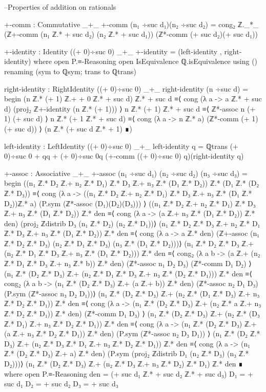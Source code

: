 \documentclass[11pt,a4paper]{article}
\begin{document}
\begin{code}
--Properties of addition on rationals

+-comm : Commutative _+_
+-comm (n₁ ÷suc d₁)(n₂ ÷suc d₂) = cong₂ ℤ._*_ (ℤ+-comm (n₁ ℤ.* + suc d₂)
  (n₂ ℤ.* + suc d₁)) (ℤ*-comm (+ suc d₂)(+ suc d₁))

+-identity : Identity ((+ 0)÷suc 0) _+_
+-identity = (left-identity , right-identity)
  where
  open P.≡-Reasoning
  open IsEquivalence ℚ.isEquivalence using ()
      renaming (sym to ℚsym; trans to ℚtrans)

  right-identity : RightIdentity  ((+ 0)÷suc 0) _+_
  right-identity (n ÷suc d) = begin
    (n ℤ.* (+ 1) ℤ.+ + 0 ℤ.* + suc d) ℤ.* + suc d  ≡⟨ cong (λ a -> a ℤ.* + suc d)
      (proj₂ ℤ+-identity (n ℤ.* (+ 1))) ⟩
    n ℤ.* (+ 1) ℤ.* + suc d ≡⟨ ℤ*-assoc n (+ 1) (+ suc d) ⟩
    n ℤ.* (+ 1 ℤ.* + suc d) ≡⟨ cong (λ a -> n ℤ.* a) (ℤ*-comm (+ 1)(+ suc d)) ⟩
    (n ℤ.* (+ suc d ℤ.* + 1) ∎)

  left-identity : LeftIdentity ((+ 0)÷suc 0) _+_
  left-identity q = ℚtrans {(+ 0)÷suc 0 + q}{q + (+ 0)÷suc 0}{q}
    (+-comm ((+ 0)÷suc 0) q)(right-identity q)

+-assoc : Associative _+_
+-assoc (n₁ ÷suc d₁)  (n₂ ÷suc d₂) (n₃ ÷suc d₃) = begin
  ((n₁ ℤ.* D₂ ℤ.+ n₂ ℤ.* D₁) ℤ.* D₃ ℤ.+ n₃ ℤ.* (D₁ ℤ.* D₂))
  ℤ.* (D₁ ℤ.* (D₂ ℤ.* D₃)) ≡⟨ cong (λ a -> ((n₁ ℤ.* D₂ ℤ.+ n₂ ℤ.* D₁) ℤ.* D₃
  ℤ.+ n₃ ℤ.* (D₁ ℤ.* D₂))ℤ.* a) (P.sym (ℤ*-assoc (D₁)(D₂)(D₃))) ⟩
  ((n₁ ℤ.* D₂ ℤ.+ n₂ ℤ.* D₁) ℤ.* D₃ ℤ.+ n₃ ℤ.* (D₁ ℤ.* D₂)) ℤ.* den
  ≡⟨ cong (λ a -> (a ℤ.+  n₃ ℤ.* (D₁ ℤ.* D₂)) ℤ.* den)
  (proj₂ ℤdistrib D₃ (n₁ ℤ.* D₂) (n₂ ℤ.* D₁))⟩
  (n₁ ℤ.* D₂ ℤ.* D₃ ℤ.+ n₂ ℤ.* D₁ ℤ.* D₃ ℤ.+ n₃ ℤ.* (D₁ ℤ.* D₂)) ℤ.* den
  ≡⟨ cong (λ a -> a ℤ.* den) (ℤ+-assoc (n₁ ℤ.* D₂ ℤ.* D₃)
    (n₂ ℤ.* D₁ ℤ.* D₃) (n₃ ℤ.* (D₁ ℤ.* D₂)))⟩
  (n₁ ℤ.* D₂ ℤ.* D₃ ℤ.+ (n₂ ℤ.* D₁ ℤ.* D₃ ℤ.+ n₃ ℤ.* (D₁ ℤ.* D₂))) ℤ.* den
  ≡⟨ cong₂ (λ a b -> (a ℤ.+ (n₂ ℤ.* D₁ ℤ.* D₃ ℤ.+ n₃ ℤ.* b)) ℤ.* den)
    (ℤ*-assoc n₁ D₂ D₃) (ℤ*-comm D₁ D₂) ⟩
  (n₁ ℤ.* (D₂ ℤ.* D₃) ℤ.+ (n₂ ℤ.* D₁ ℤ.* D₃ ℤ.+ n₃ ℤ.* (D₂ ℤ.* D₁))) ℤ.* den
  ≡⟨ cong₂ (λ a b -> (n₁ ℤ.* (D₂ ℤ.* D₃) ℤ.+ (a ℤ.+ b)) ℤ.* den)
    (ℤ*-assoc n₂ D₁ D₃) (P.sym (ℤ*-assoc n₃ D₂ D₁))⟩
 (n₁ ℤ.* (D₂ ℤ.* D₃) ℤ.+ (n₂ ℤ.* (D₁ ℤ.* D₃) ℤ.+ n₃ ℤ.* D₂ ℤ.* D₁)) ℤ.* den
 ≡⟨ cong (λ a -> (n₁ ℤ.* (D₂ ℤ.* D₃) ℤ.+ (n₂ ℤ.* a ℤ.+ n₃ ℤ.* D₂ ℤ.* D₁))
 ℤ.* den) (ℤ*-comm D₁ D₃)  ⟩
  (n₁ ℤ.* (D₂ ℤ.* D₃) ℤ.+ (n₂ ℤ.* (D₃ ℤ.* D₁) ℤ.+ n₃ ℤ.* D₂ ℤ.* D₁)) ℤ.*
  den ≡⟨ cong (λ a -> (n₁ ℤ.* (D₂ ℤ.* D₃) ℤ.+ (a ℤ.+ n₃ ℤ.* D₂ ℤ.* D₁))
    ℤ.* den) (P.sym (ℤ*-assoc n₂ D₃ D₁))  ⟩
  (n₁ ℤ.* (D₂ ℤ.* D₃) ℤ.+ (n₂ ℤ.* D₃ ℤ.* D₁ ℤ.+ n₃ ℤ.* D₂ ℤ.* D₁)) ℤ.* den
  ≡⟨ cong (λ a -> (n₁ ℤ.* (D₂ ℤ.* D₃) ℤ.+ a) ℤ.* den)
    (P.sym (proj₂ ℤdistrib D₁ (n₂ ℤ.* D₃) (n₃ ℤ.* D₂)))⟩
  (n₁ ℤ.* (D₂ ℤ.* D₃) ℤ.+ (n₂ ℤ.* D₃ ℤ.+ n₃ ℤ.* D₂) ℤ.* D₁) ℤ.* den ∎
    where
     open P.≡-Reasoning
     den = (+ suc d₁ ℤ.* + suc d₂ ℤ.* + suc d₃)
     D₁ = + suc d₁
     D₂ = + suc d₂
     D₃ = + suc d₃


\end{code}
\end{document}
